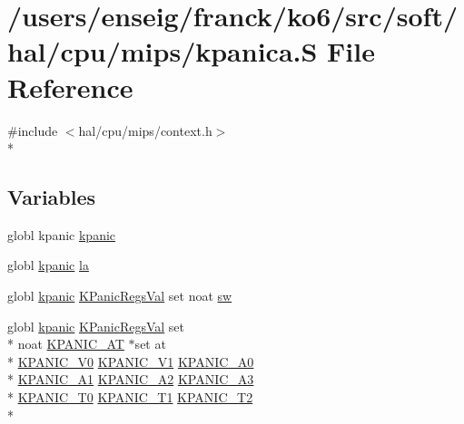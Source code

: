 \hypertarget{mips_2kpanica_8S}{\section{/users/enseig/franck/ko6/src/soft/hal/cpu/mips/kpanica.S File Reference}
\label{mips_2kpanica_8S}
}
{\ttfamily \#include $<$hal/cpu/mips/context.\-h$>$}\\*
\subsection*{Variables}
\begin{DoxyCompactItemize}
\item 
globl kpanic \hyperlink{mips_2kpanica_8S_a7f530336b5f1563eee0a1052ea0d4a9b}{kpanic}
\item 
globl \hyperlink{kpanic_8h_af2300a4e16ba31370a9ae2920be551d5}{kpanic} \hyperlink{mips_2kpanica_8S_a2fb13edcab8f873099119dfe01c49d47}{la}
\item 
globl \hyperlink{kpanic_8h_af2300a4e16ba31370a9ae2920be551d5}{kpanic} \hyperlink{riscv_2kpanicc_8c_a0082ae414fed384bc55eb64768a5d4d6}{K\-Panic\-Regs\-Val} set noat \hyperlink{mips_2kpanica_8S_a471a6b72df82affa86c1f5c7377c5f72}{sw}
\item 
globl \hyperlink{kpanic_8h_af2300a4e16ba31370a9ae2920be551d5}{kpanic} \hyperlink{riscv_2kpanicc_8c_a0082ae414fed384bc55eb64768a5d4d6}{K\-Panic\-Regs\-Val} set \\*
noat \hyperlink{mips_2context_8h_abc821e3e09a2205f660f097f67eb77da}{K\-P\-A\-N\-I\-C\-\_\-\-A\-T} $\ast$set at \\*
\hyperlink{mips_2context_8h_a172216752ad05ff68b012c9267aec5cb}{K\-P\-A\-N\-I\-C\-\_\-\-V0} \hyperlink{mips_2context_8h_a95c05b789db5f2599a729d7c12d1c1d7}{K\-P\-A\-N\-I\-C\-\_\-\-V1} \hyperlink{riscv_2context_8h_ac65fdd3fcb6fd923a64e240fb3ecb014}{K\-P\-A\-N\-I\-C\-\_\-\-A0} \\*
\hyperlink{riscv_2context_8h_a0992efc82e6ce6ceb2267bfbc3dee401}{K\-P\-A\-N\-I\-C\-\_\-\-A1} \hyperlink{riscv_2context_8h_ae605ca93c0bdd8d69d78fbae6f46cd0a}{K\-P\-A\-N\-I\-C\-\_\-\-A2} \hyperlink{riscv_2context_8h_a303f9d15714a0c328f1abfff3ff6e47a}{K\-P\-A\-N\-I\-C\-\_\-\-A3} \\*
\hyperlink{riscv_2context_8h_aef7eeacfd08615b559a1a1f78ffd1e29}{K\-P\-A\-N\-I\-C\-\_\-\-T0} \hyperlink{riscv_2context_8h_a1fd0c4fae0a8b28b10432586da6809fb}{K\-P\-A\-N\-I\-C\-\_\-\-T1} \hyperlink{riscv_2context_8h_a112e01b2a72cf0b09991ca3f070f2574}{K\-P\-A\-N\-I\-C\-\_\-\-T2} \\*

\end{DoxyCompactItemize}
